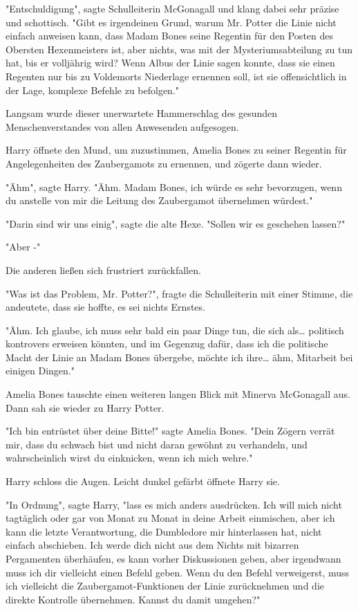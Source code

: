 {"Entschuldigung", sagte Schulleiterin McGonagall und klang dabei sehr präzise und schottisch. "Gibt es irgendeinen Grund, warum Mr. Potter die Linie nicht einfach anweisen kann, dass Madam Bones seine Regentin für den Posten des Obersten Hexenmeisters ist, aber nichts, was mit der Mysteriumsabteilung zu tun hat, bis er volljährig wird? Wenn Albus der Linie sagen konnte, dass sie einen Regenten nur bis zu Voldemorts Niederlage ernennen soll, ist sie offensichtlich in der Lage, komplexe Befehle zu befolgen."

Langsam wurde dieser unerwartete Hammerschlag des gesunden Menschenverstandes von allen Anwesenden aufgesogen.

Harry öffnete den Mund, um zuzustimmen, Amelia Bones zu seiner Regentin für Angelegenheiten des Zaubergamots zu ernennen, und zögerte dann wieder.

"Ähm", sagte Harry. "Ähm. Madam Bones, ich würde es sehr bevorzugen, wenn du anstelle von mir die Leitung des Zaubergamot übernehmen würdest."

"Darin sind wir uns einig", sagte die alte Hexe. "Sollen wir es geschehen lassen?"

"Aber -"

Die anderen ließen sich frustriert zurückfallen.

"Was ist das Problem, Mr. Potter?", fragte die Schulleiterin mit einer Stimme, die andeutete, dass sie hoffte, es sei nichts Ernstes.

"Ähm. Ich glaube, ich muss sehr bald ein paar Dinge tun, die sich als… politisch kontrovers erweisen könnten, und im Gegenzug dafür, dass ich die politische Macht der Linie an Madam Bones übergebe, möchte ich ihre… ähm, Mitarbeit bei einigen Dingen."

Amelia Bones tauschte einen weiteren langen Blick mit Minerva McGonagall aus.\\ Dann sah sie wieder zu Harry Potter.

"Ich bin entrüstet über deine Bitte!" sagte Amelia Bones. "Dein Zögern verrät mir, dass du schwach bist und nicht daran gewöhnt zu verhandeln, und wahrscheinlich wirst du einknicken, wenn ich mich wehre."

Harry schloss die Augen. Leicht dunkel gefärbt öffnete Harry sie.

"In Ordnung", sagte Harry, "lass es mich anders ausdrücken. Ich will mich nicht tagtäglich oder gar von Monat zu Monat in deine Arbeit einmischen, aber ich kann die letzte Verantwortung, die Dumbledore mir hinterlassen hat, nicht einfach abschieben. Ich werde dich nicht aus dem Nichts mit bizarren Pergamenten überhäufen, es kann vorher Diskussionen geben, aber irgendwann muss ich dir vielleicht einen Befehl geben. Wenn du den Befehl verweigerst, muss ich vielleicht die Zaubergamot-Funktionen der Linie zurücknehmen und die direkte Kontrolle übernehmen. Kannst du damit umgehen?"

}
